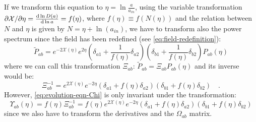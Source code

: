 
If we transform this equation to $\eta=\ln\frac{a}{a_{in}}$, using
the variable transformation $\partial\mathcal{X}/\partial\eta=\frac{\mathrm{d}\ln D(a)}{\mathrm{d}\ln a}=f(\eta)$,
where $f(\eta)\equiv f(N(\eta))$ and the relation between $N$ and
$\eta$ is given by $N=\eta+\ln(a_{in})$, we have to transform also
the power spectrum since the field has been redefined (see \cref{eq:field-redefinition}):
\begin{equation}
\tilde{P}_{ab}=e^{-2\mathcal{X}(\eta)}e^{2\eta}(\delta_{a1}+\frac{1}{f(\eta)}\delta_{a2})(\delta_{b1}+\frac{1}{f(\eta)}\delta_{b2})P_{ab}(\eta)\label{eq:PS-transformation}
\end{equation}
where we can call this transformation $\varXi_{ab}$: 
\beeqc$ 
\tilde{P}_{ab}=\varXi_{ab}P_{ab}(\eta)
$
and its inverse would be: 
\begin{equation}
\varXi_{ab}^{-1}=e^{2\mathcal{X}(\eta)}e^{-2\eta}(\delta_{a1}+f(\eta)\delta_{a2})(\delta_{b1}+f(\eta)\delta_{b2}) \quad .
\end{equation}
However, \cref{eq:evolution-eqn-Chi} is only invariant under
the transformation:
\begin{equation}
\varUpsilon_{ab}(\eta)=f(\eta)\varXi_{ab}^{-1}=f(\eta)e^{2\mathcal{X}(\eta)}e^{-2\eta}(\delta_{a1}+f(\eta)\delta_{a2})(\delta_{b1}+f(\eta)\delta_{b2})
\end{equation}
since we also have to transform the derivatives and the $\Omega_{ab}$
matrix.

